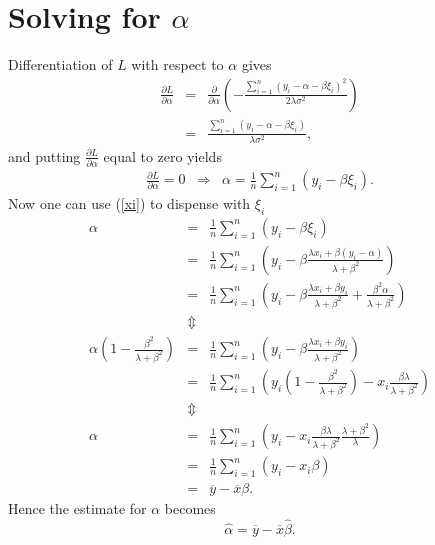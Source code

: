 \documentclass[a4paper,twoside,12pt]{article}
\begin{document}
\section{Solving for $\alpha$}
Differentiation of $L$ with respect to $\alpha$ gives
\begin{eqnarray*}
\frac{\partial L}{\partial\alpha}
&=&
\frac{\partial}{\partial\alpha}\left(
-\frac{\sum_{i=1}^n(y_i-\alpha-\beta\xi_i)^2}{2\lambda\sigma^2}\right)\\[1em]
&=&
\frac{\sum_{i=1}^n (y_i-\alpha-\beta\xi_i)}{\lambda\sigma^2},
\end{eqnarray*}
and putting $\frac{\partial L}{\partial \alpha}$ equal to zero yields
\begin{eqnarray*}%
\frac{\partial L}{\partial \alpha}=0
&\Rightarrow&
\alpha=\frac{1}{n}\sum_{i=1}^n(y_i-\beta\xi_i).
\end{eqnarray*}
Now one can use (\ref{xi}) to dispense with $\xi_i$ 
\begin{eqnarray*}
\alpha
&=&
\frac{1}{n}\sum_{i=1}^n(y_i-\beta\xi_i)\\[1em]
&=&
\frac{1}{n}\sum_{i=1}^n\left(y_i-\beta\frac{\lambda
  x_i+\beta(y_i-\alpha)}{\lambda+\beta^2}\right)\\[1em]
&=&
\frac{1}{n}\sum_{i=1}^n\left(y_i-\beta\frac{\lambda x_i+\beta y_i}{\lambda+\beta^2}+\frac{\beta^2\alpha}{\lambda+\beta^2}
\right)\\[1em]
&\Updownarrow&\\[1em]
\alpha\left(1-\frac{\beta^2}{\lambda+\beta^2}\right)
&=&
\frac{1}{n}\sum_{i=1}^n\left(y_i-\beta\frac{\lambda x_i+\beta y_i}{\lambda+\beta^2}
\right)\\[1em]
&=&
\frac{1}{n}\sum_{i=1}^n\left(y_i\left(1-\frac{\beta^2}{\lambda+\beta^2}\right)-x_i\frac{\beta\lambda}{\lambda+\beta^2}
\right)\\[1em]
&\Updownarrow&\\[1em]
\alpha
&=&
\frac{1}{n}\sum_{i=1}^n\left(y_i-x_i\frac{\beta\lambda}{\lambda+\beta^2}\frac{\lambda+\beta^2}{\lambda}
\right)\\[1em]
&=&
\frac{1}{n}\sum_{i=1}^n\left(y_i-x_i\beta\right)\\[1em]
&=&
\overline{y}-\overline{x}\beta.
\end{eqnarray*}
Hence the estimate for $\alpha$ becomes
$$
\hat{\alpha}=\overline{y}-\overline{x}\hat{\beta}.
$$

\end{document}
